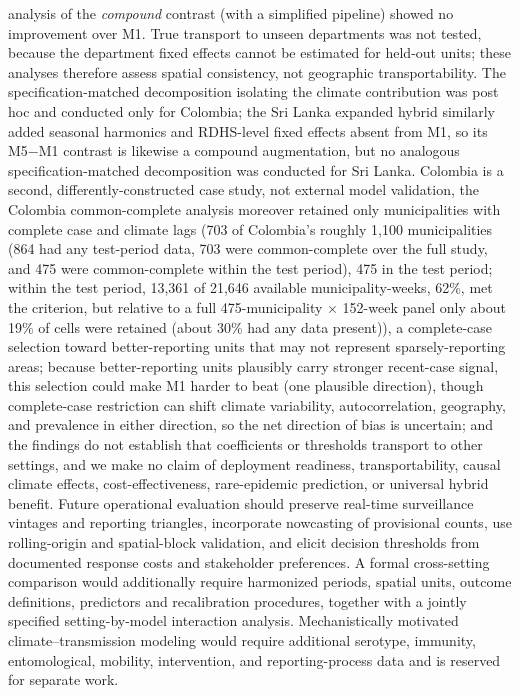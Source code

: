 \documentclass[11pt,a4paper]{article}
\begin{document}
analysis of the \emph{compound} contrast (with a simplified pipeline) showed no improvement over M1. True transport to unseen departments was not tested, because the department fixed effects cannot be estimated for held-out units; these analyses therefore assess spatial consistency, not geographic transportability. The specification-matched decomposition isolating the climate contribution was post hoc and conducted only for Colombia; the Sri Lanka expanded hybrid similarly added seasonal harmonics and RDHS-level fixed effects absent from M1, so its M5$-$M1 contrast is likewise a compound augmentation, but no analogous specification-matched decomposition was conducted for Sri Lanka. Colombia is a second, differently-constructed case study, not external model validation, the Colombia common-complete analysis moreover retained only municipalities with complete case and climate lags (703 of Colombia's roughly 1,100 municipalities (864 had any test-period data, 703 were common-complete over the full study, and 475 were common-complete within the test period), 475 in the test period; within the test period, 13,361 of 21,646 available municipality-weeks, 62\%, met the criterion, but relative to a full 475-municipality $\times$ 152-week panel only about 19\% of cells were retained (about 30\% had any data present)), a complete-case selection toward better-reporting units that may not represent sparsely-reporting areas; because better-reporting units plausibly carry stronger recent-case signal, this selection could make M1 harder to beat (one plausible direction), though complete-case restriction can shift climate variability, autocorrelation, geography, and prevalence in either direction, so the net direction of bias is uncertain; and the findings do not establish that coefficients or thresholds transport to other settings, and we make no claim of deployment readiness, transportability, causal climate effects, cost-effectiveness, rare-epidemic prediction, or universal hybrid benefit. Future operational evaluation should preserve real-time surveillance vintages and reporting triangles, incorporate nowcasting of provisional counts, use rolling-origin and spatial-block validation, and elicit decision thresholds from documented response costs and stakeholder preferences. A formal cross-setting comparison would additionally require harmonized periods, spatial units, outcome definitions, predictors and recalibration procedures, together with a jointly specified setting-by-model interaction analysis. Mechanistically motivated climate--transmission modeling would require additional serotype, immunity, entomological, mobility, intervention, and reporting-process data and is reserved for separate work.
\end{document}
